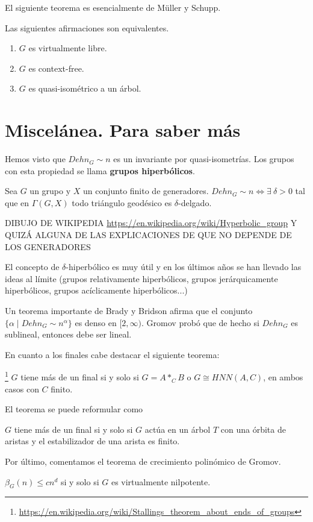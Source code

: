 \documentclass[twoside, 11pt]{article}
\begin{document}
El siguiente teorema es esencialmente de Müller y Schupp. 

\begin{teorema}
Las siguientes afirmaciones son equivalentes.
\begin{enumerate}
\item $G$ es virtualmente libre.
\item $G$ es context-free.
\item $G$ es quasi-isométrico a un árbol.
\end{enumerate}
\end{teorema}

\section{Miscelánea. Para saber más}
Hemos visto que $Dehn_G\sim n$ es un invariante por quasi-isometrías. Los grupos con esta propiedad se llama \textbf{grupos hiperbólicos}.
\begin{teorema}
Sea $G$ un grupo y $X$ un conjunto finito de generadores. $Dehn_G\sim n\Leftrightarrow \exists\ \delta>0$ tal que en $\Gamma(G,X)$ todo triángulo geodésico es $\delta$-delgado. 
\end{teorema}

DIBUJO DE WIKIPEDIA \url{https://en.wikipedia.org/wiki/Hyperbolic_group} Y QUIZÁ ALGUNA DE LAS EXPLICACIONES DE QUE NO DEPENDE DE LOS GENERADORES

El concepto de $\delta$-hiperbólico es muy útil y en los últimos años se han llevado las ideas al límite (grupos relativamente hiperbólicos, grupos jerárquicamente hiperbólicos, grupos acíclicamente hiperbólicos...)

Un teorema importante de Brady y Bridson afirma que el conjunto $\{\alpha\mid Dehn_G\sim n^{\alpha}\}$ es denso en $[2,\infty)$. Gromov probó que de hecho si $Dehn_G$ es sublineal, entonces debe ser lineal. 

En cuanto a los finales cabe destacar el siguiente teorema:
\begin{teorema}[Stallings]\footnote{\url{https://en.wikipedia.org/wiki/Stallings_theorem_about_ends_of_groups}}
$G$ tiene más de un final si y solo si $G=A*_C B$ o $G\cong HNN(A,C)$, en ambos casos con $C$ finito. 
\end{teorema}

El teorema se puede reformular como
\begin{teorema}
$G$ tiene más de un final si y solo si $G$ actúa en un árbol $T$ con una órbita de aristas y el estabilizador de una arista es finito.
\end{teorema}

Por último, comentamos el teorema de crecimiento polinómico de Gromov. 
\begin{teorema}
$\beta_G(n)\leq cn^d$ si y solo si $G$ es virtualmente nilpotente. 
\end{teorema}
\end{document}
